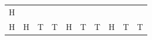 {\begin{center}
\begin{xtabular*}{\mytablewidth}[t]{|p{10\mystarwidth}|p{10\mystarwidth}|p{10\mystarwidth}|p{10\mystarwidth}|p{10\mystarwidth}|p{10\mystarwidth}|p{10\mystarwidth}|p{10\mystarwidth}|p{10\mystarwidth}|p{10\mystarwidth}|}
        H%
     \tabularnewline{}
        H &
        H &
        T &
        T &
        H &
        T &
        T &
        H &
        T &
        T%
     \tabularnewline{}

\end{xtabular*}
\end{center}}
